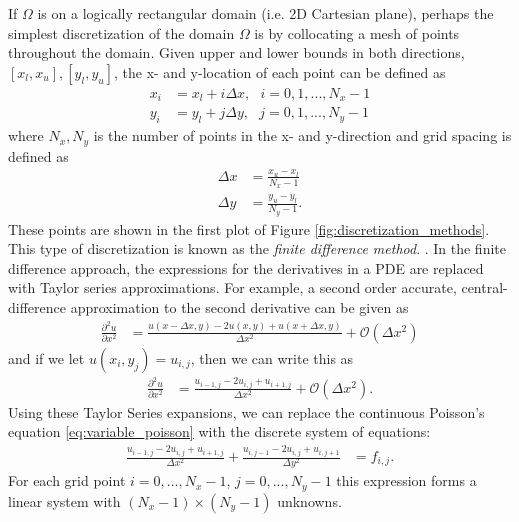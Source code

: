 If $\Omega$ is on a logically rectangular domain (i.e. 2D Cartesian plane), perhaps the simplest discretization of the domain $\Omega$ is by collocating a mesh of points throughout the domain. Given upper and lower bounds in both directions, $[x_l, x_u], [y_l, y_u]$, the x- and y-location of each point can be defined as
\begin{align}
    x_i &= x_l + i \Delta x,\ \ \ i = 0, 1, ..., N_x-1 \\
    y_i &= y_l + j \Delta y,\ \ \ j = 0, 1, ..., N_y-1
\end{align}
where $N_x, N_y$ is the number of points in the x- and y-direction and grid spacing is defined as
\begin{align}
    \Delta x &= \frac{x_u - x_l}{N_x - 1} \\
    \Delta y &= \frac{y_u - y_l}{N_y - 1}.
\end{align}
These points are shown in the first plot of Figure \ref{fig:discretization_methods}. This type of discretization is known as the {\em finite difference method}. . In the finite difference approach, the expressions for the derivatives in a PDE are replaced with Taylor series approximations. For example, a second order accurate, central-difference approximation to the second derivative can be given as
\begin{align}
    \frac{\partial^2 u}{\partial x^2} &= \frac{u(x - \Delta x, y) - 2u(x, y) + u(x + \Delta x, y)}{\Delta x^2} + \mathcal{O}(\Delta x^2)
\end{align}
and if we let $u(x_i, y_j) = u_{i,j}$, then we can write this as
\begin{align}
    \frac{\partial^2 u}{\partial x^2} &= \frac{u_{i-1,j} - 2u_{i,j} + u_{i+1,j}}{\Delta x^2} + \mathcal{O}(\Delta x^2).
\end{align}
Using these Taylor Series expansions, we can replace the continuous Poisson's equation \ref{eq:variable_poisson} with the discrete system of equations:
\begin{align}
    \frac{u_{i-1,j} - 2u_{i,j} + u_{i+1,j}}{\Delta x^2} + \frac{u_{i,j-1} - 2u_{i,j} + u_{i,j+1}}{\Delta y^2} &= f_{i,j}.
    \label{eq:poisson_FD}
\end{align}
For each grid point $i = 0, ..., N_x - 1$, $j = 0, ..., N_y - 1$ this expression forms a linear system with $(N_x-1) \times (N_y-1)$ unknowns.

